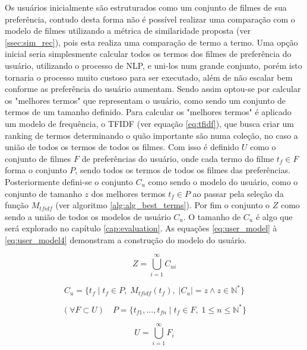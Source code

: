 Os usuários inicialmente são estruturados como um conjunto de filmes de sua preferência, contudo desta forma não é possível realizar uma comparação com o modelo de filmes utilizando a métrica de similaridade proposta (ver \ref{ssec:sim_rec}), pois esta realiza uma comparação de termo a termo. Uma opção inicial seria simplesmente calcular todos os termos dos filmes de preferência do usuário, utilizando o processo de \ac{NLP}, e uni-los num grande conjunto, porém isto tornaria o processo muito custoso para ser executado, além de não escalar bem conforme as preferência do usuário aumentam. Sendo assim optou-se por calcular os "melhores termos" que representam o usuário, como sendo um conjunto de termos de um tamanho definido. Para calcular os "melhores termos" é aplicado um modelo de frequência, o \ac{TFIDF} (ver equação \ref{eq:tfidf}), que busca criar um ranking de termos determinando o quão importante são numa coleção, no caso a união de todos os termos de todos os filmes. Com isso é definido $U$ como o conjunto de filmes $F$ de preferências do usuário, onde cada termo do filme $t_f \in F$ forma o conjunto $P$, sendo todos os termos de todos os filmes das preferências. Posteriormente defini-se o conjunto $C_u$ como sendo o modelo do usuário, como o conjunto de tamanho $z$ dos melhores termos $t_f \in P$ ao passar pela seleção da função $M_{tfidf}$ (ver algoritmo \ref{alg:alg_best_terms}). Por fim o conjunto o $Z$ como sendo a união de todos os modelos de usuário $C_u$. O tamanho de $C_u$ é algo que será explorado no capítulo \ref{cap:evaluation}. As equações \ref{eq:user_model} à \ref{eq:user_model4} demonstram a construção do modelo do usuário.

\begin{equation}
	Z = \bigcup\limits_{i=1}^{\infty} C_{ui}
\label{eq:user_model}
\end{equation}

\begin{equation}
	C_u = \{t_f \;| \; t_f \in P, \; M_{tfidf}(t_f), \; |C_u| = z \land z \in \mathbb{N}^*\}
\end{equation}

\begin{equation}
	(\forall F \subset U) \quad P = \{t_{f1}, ..., t_{fn} \; | \; t_f \in F, \; 1 \leq n \leq \mathbb{N}^*\}
\end{equation}

\begin{equation}
	U = \bigcup\limits_{i=1}^{\infty} F_i
\label{eq:user_model4}
\end{equation}

